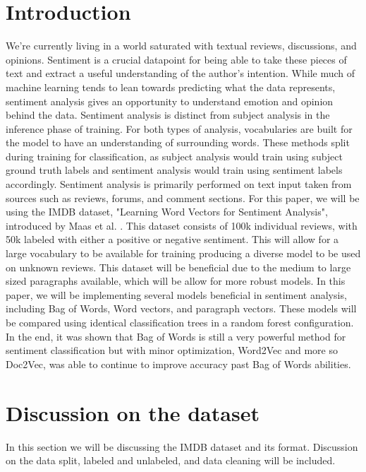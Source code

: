 \documentclass[journal]{IEEEtran}
\begin{document}
\section{Introduction}

We’re currently living in a world saturated with textual reviews, discussions, and opinions. Sentiment is a crucial datapoint for being able to take these pieces of text and extract a useful understanding of the author's intention. While much of machine learning tends to lean towards predicting what the data represents, sentiment analysis gives an opportunity to understand emotion and opinion behind the data. 
Sentiment analysis is distinct from subject analysis in the inference phase of training. For both types of analysis, vocabularies are built for the model to have an understanding of surrounding words. These methods split during training for classification, as subject analysis would train using subject ground truth labels and sentiment analysis would train using sentiment labels accordingly. Sentiment analysis is primarily performed on text input taken from sources such as reviews, forums, and comment sections. 
For this paper, we will be using the IMDB dataset, "Learning Word Vectors for Sentiment Analysis", introduced by Maas et al. \cite{maas-EtAl:2011:ACL-HLT2011}. This dataset consists of 100k individual reviews, with 50k labeled with either a positive or negative sentiment. This will allow for a large vocabulary to be available for training producing a diverse model to be used on unknown reviews. This dataset will be beneficial due to the medium to large sized paragraphs available, which will be allow for more robust models. In this paper, we will be implementing several models beneficial in sentiment analysis, including Bag of Words, Word vectors, and paragraph vectors. These models will be compared using identical classification trees in a random forest configuration. In the end, it was shown that Bag of Words is still a very powerful method for sentiment classification but with minor optimization, Word2Vec and more so Doc2Vec, was able to continue to improve accuracy past Bag of Words abilities. 

\section{Discussion on the dataset}
In this section we will be discussing the IMDB dataset and its format. Discussion on the data split, labeled and unlabeled, and data cleaning will be included. 
\end{document}
